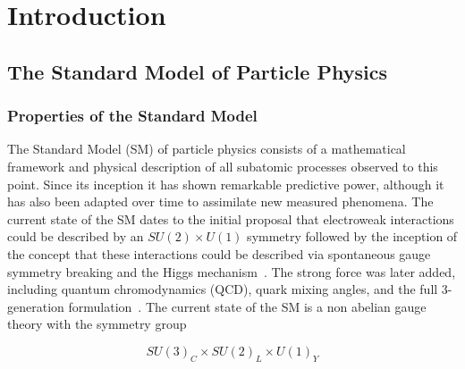 
\chapter{Introduction} %

\label{intro} %




\section{The Standard Model of Particle Physics}

\subsection{Properties of the Standard Model}
The Standard Model (SM) of particle physics consists of a mathematical framework and physical description of all subatomic processes observed to this point.  Since its inception it has shown remarkable predictive power, although it has also been adapted over time to assimilate new measured phenomena.  The current state of the SM dates to the initial proposal that electroweak interactions could be described by an $SU(2) \times U(1)$ symmetry followed by the inception of the concept that these interactions could be described via spontaneous gauge symmetry breaking and the Higgs mechanism~\cite{StandardModelPrimer,Glashow:1961tr,PhysRevLett.13.508,Weinberg:1967tq,1964PhL....13..168S}.  The strong force was later added, including quantum chromodynamics (QCD), quark mixing angles, and the full 3-generation formulation~\cite{StandardModelPrimer,PhysRevD.2.1285,PhysRevLett.27.1688,PhysRevLett.10.531}.  The current state of the SM is a non abelian gauge theory with the symmetry group 

\begin{equation}
SU(3)_{C} \times SU(2)_{L} \times U(1)_{Y}
\label{eq:SMSymmetry}
\end{equation}

